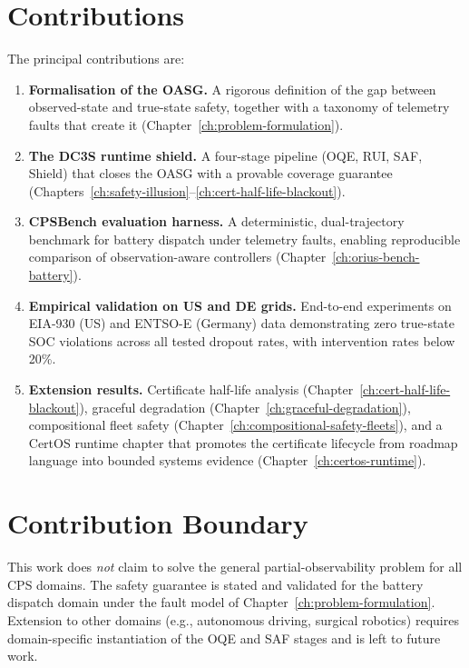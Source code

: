 \section{Contributions}

The principal contributions are:

\begin{enumerate}
  \item \textbf{Formalisation of the OASG.}  A rigorous definition of the
    gap between observed-state and true-state safety, together with a
    taxonomy of telemetry faults that create it
    (Chapter~\ref{ch:problem-formulation}).
  \item \textbf{The DC3S runtime shield.}  A four-stage pipeline (OQE,
    RUI, SAF, Shield) that closes the OASG with a provable coverage
    guarantee (Chapters~\ref{ch:safety-illusion}--\ref{ch:cert-half-life-blackout}).
  \item \textbf{CPSBench evaluation harness.}  A deterministic,
    dual-trajectory benchmark for battery dispatch under telemetry faults,
    enabling reproducible comparison of observation-aware controllers
    (Chapter~\ref{ch:orius-bench-battery}).
  \item \textbf{Empirical validation on US and DE grids.}  End-to-end
    experiments on EIA-930 (US) and ENTSO-E (Germany) data demonstrating
    zero true-state SOC violations across all tested dropout rates, with
    intervention rates below 20\%.
  \item \textbf{Extension results.}  Certificate half-life analysis
    (Chapter~\ref{ch:cert-half-life-blackout}), graceful degradation
    (Chapter~\ref{ch:graceful-degradation}), compositional fleet safety
    (Chapter~\ref{ch:compositional-safety-fleets}), and a CertOS runtime
    chapter that promotes the certificate lifecycle from roadmap language
    into bounded systems evidence (Chapter~\ref{ch:certos-runtime}).
\end{enumerate}

\section{Contribution Boundary}

This work does \emph{not} claim to solve the general partial-observability
problem for all CPS domains.  The safety guarantee is stated and validated
for the battery dispatch domain under the fault model of
Chapter~\ref{ch:problem-formulation}.  Extension to other domains
(e.g., autonomous driving, surgical robotics) requires domain-specific
instantiation of the OQE and SAF stages and is left to future work.

